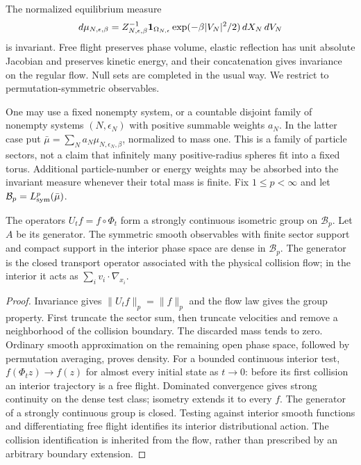 The normalized equilibrium measure
\[
 d\mu_{N,\epsilon,\beta}
 =Z_{N,\epsilon,\beta}^{-1}\mathbf 1_{\Omega_{N,\epsilon}}
             \exp(-\beta |V_N|^2/2)\,dX_N\,dV_N
\]
is invariant. Free flight preserves phase volume, elastic reflection has
unit absolute Jacobian and preserves kinetic energy, and their
concatenation gives invariance on the regular flow. Null sets are
completed in the usual way. We restrict to permutation-symmetric
observables.

One may use a fixed nonempty system, or a countable disjoint family of
nonempty systems $(N,\epsilon_N)$ with positive summable weights $a_N$.
In the latter case put $\bar\mu=\sum_N a_N\mu_{N,\epsilon_N,\beta}$,
normalized to mass one. This is a family of particle sectors, not a claim
that infinitely many positive-radius spheres fit into a fixed torus.
Additional particle-number or energy weights may be absorbed into the
invariant measure whenever their total mass is finite. Fix $1\le p<\infty$
and let $\mathcal B_p=L^p_{\rm sym}(\bar\mu)$.

\begin{lemma}
\label{lem:v11-flow}
The operators $U_t f=f\circ\Phi_t$ form a strongly continuous isometric
group on $\mathcal B_p$. Let $A$ be its generator. The symmetric smooth
observables with finite sector support and compact support in the
interior phase space are dense in $\mathcal B_p$. The generator is the
closed transport operator associated with the physical collision flow;
in the interior it acts as $\sum_i v_i\cdot\nabla_{x_i}$.
\end{lemma}

\begin{proof}
Invariance gives $\|U_tf\|_p=\|f\|_p$ and the flow law gives the group
property. First truncate the sector sum, then truncate velocities and
remove a neighborhood of the collision boundary. The discarded mass
tends to zero. Ordinary smooth approximation on the remaining open
phase space, followed by permutation averaging, proves density.
For a bounded continuous interior test, $f(\Phi_tz)\to f(z)$ for almost
every initial state as $t\to0$: before its first collision an interior
trajectory is a free flight. Dominated convergence gives strong
continuity on the dense test class; isometry extends it to every $f$.
The generator of a strongly continuous group is closed. Testing against
interior smooth functions and differentiating free flight identifies its
interior distributional action. The collision identification is inherited
from the flow, rather than prescribed by an arbitrary boundary extension.
\end{proof}

